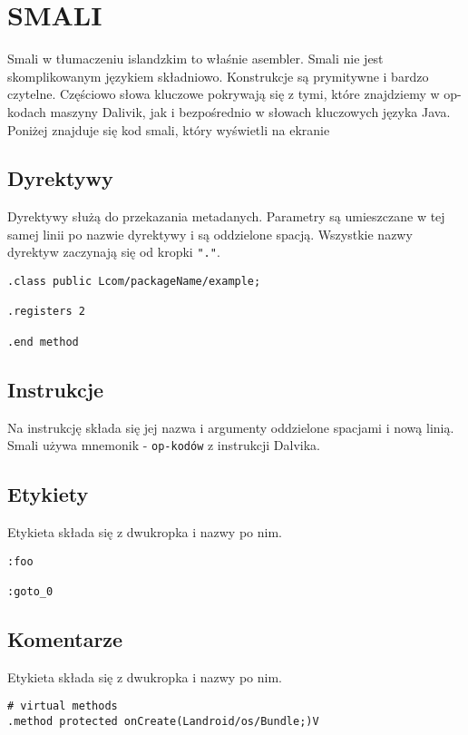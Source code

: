 \documentclass[12pt,a4paper,leqno,oneside,titlepage]{book}
\begin{document}
\section{SMALI}
\label{smali}
%
Smali w tłumaczeniu islandzkim to właśnie asembler\cite{SmaliWiki}. Smali nie jest skomplikowanym językiem składniowo. Konstrukcje są prymitywne i bardzo czytelne. Częściowo słowa kluczowe pokrywają się z tymi, które znajdziemy w op-kodach maszyny Dalivik, jak i bezpośrednio w słowach kluczowych języka Java.  Poniżej znajduje się kod smali, który wyświetli na ekranie 

% 
\subsection{Dyrektywy}
%
Dyrektywy służą do przekazania metadanych.
Parametry są umieszczane w tej samej linii po nazwie dyrektywy i są oddzielone spacją.
Wszystkie nazwy dyrektyw zaczynają się od kropki \verb|"."|.
%
\begin{lstlisting}[language=smali,captionpos=b, caption={Przykład składni dyrektyw}]
.class public Lcom/packageName/example;

.registers 2

.end method
\end{lstlisting}
%
\subsection{Instrukcje}
%
Na instrukcję składa się jej nazwa i argumenty oddzielone spacjami i nową linią.
Smali używa mnemonik - \verb|op-kodów| z instrukcji Dalvika\cite{DalvikOpCodes}.
%
\subsection{Etykiety}
%
Etykieta składa się z dwukropka i nazwy po nim.
\begin{lstlisting}[language=smali,captionpos=b, caption={Przykład etykiet}]
:foo

:goto_0
\end{lstlisting}
%
\subsection{Komentarze}
%
%
Etykieta składa się z dwukropka i nazwy po nim.
\begin{lstlisting}[language=smali,captionpos=b, caption={Przykład komentarzy}]
# virtual methods
.method protected onCreate(Landroid/os/Bundle;)V
\end{lstlisting}
%
\end{document}
